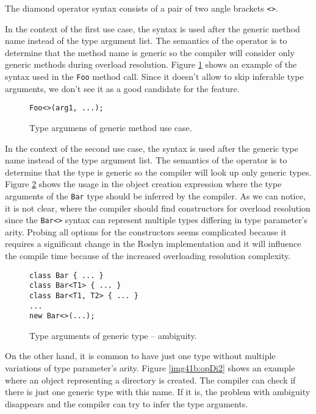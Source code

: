 The diamond operator syntax consists of a pair of two angle brackets \texttt{<>}.
\par
In the context of the first use case, the syntax is used after the generic method name instead of the type argument list.
The semantics of the operator is to determine that the method name is generic so the compiler will consider only generic methods during overload resolution.
Figure \ref{img40:opDi1} shows an example of the syntax used in the \texttt{Foo} method call.
Since it doesn't allow to skip inferable type arguments, we don't see it as a good candidate for the feature.
\begin{figure}[h]
\begin{lstlisting}[style=csharp]
Foo<>(arg1, ...);
\end{lstlisting}
\caption{Type argumens of generic method use case.}
\label{img40:opDi1}
\end{figure}
\par
In the context of the second use case, the syntax is used after the generic type name instead of the type argument list.
The semantics of the operator is to determine that the type is generic so the compiler will look up only generic types.
Figure \ref{img41a:opDi2} shows the usage in the object creation expression where the type arguments of the \texttt{Bar} type should be inferred by the compiler.
As we can notice, it is not clear, where the compiler should find constructors for overload resolution since the \texttt{Bar<>} syntax can represent multiple types differing in type parameter's arity.
Probing all options for the constructors seems complicated because it requires a significant change in the Roslyn implementation and it will influence the compile time because of the increased overloading resolution complexity. 
\begin{figure}[h!]
\begin{lstlisting}[style=csharp]
class Bar { ... }
class Bar<T1> { ... }
class Bar<T1, T2> { ... }
...
new Bar<>(...);
\end{lstlisting}
\caption{Type arguments of generic type -- ambiguity.}
\label{img41a:opDi2}
\end{figure}
On the other hand, it is common to have just one type without multiple variations of type parameter's arity.
Figure \ref{img41b:opDi2} shows an example where an object representing a directory is created.
The compiler can check if there is just one generic type with this name.
If it is, the problem with ambiguity disappears and the compiler can try to infer the type arguments.
